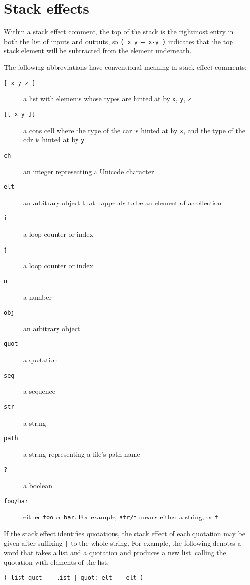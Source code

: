 \documentclass{book}
\begin{document}
\section{Stack effects}

Within a stack effect comment, the top of the stack is the rightmost entry in both the
list of inputs and outputs, so \texttt{( x y -- x-y )} indicates that the top stack element will be subtracted from the element underneath.

The following abbreviations have conventional meaning in stack effect comments:

\begin{description}
\item[\texttt{[ x y z ]}] a list with elements whose types are hinted at by \texttt{x}, \texttt{y}, \texttt{z}
\item[\texttt{[[ x y ]]}] a cons cell where the type of the car is hinted at by \texttt{x}, and the type of the cdr is hinted at by \texttt{y}
\item[\texttt{ch}] an integer representing a Unicode character
\item[\texttt{elt}] an arbitrary object that happends to be an element of a collection
\item[\texttt{i}] a loop counter or index
\item[\texttt{j}] a loop counter or index
\item[\texttt{n}] a number
\item[\texttt{obj}] an arbitrary object
\item[\texttt{quot}] a quotation
\item[\texttt{seq}] a sequence
\item[\texttt{str}] a string
\item[\texttt{path}] a string representing a file's path name
\item[\texttt{?}] a boolean
\item[\texttt{foo/bar}] either \texttt{foo} or \texttt{bar}. For example, \texttt{str/f} means either a string, or \texttt{f}
\end{description}

If the stack effect identifies quotations, the stack effect of each quotation may be given after suffixing \texttt{|} to the whole string. For example, the following denotes a word that takes a list and a quotation and produces a new list, calling the quotation with elements of the list.
\begin{verbatim}
( list quot -- list | quot: elt -- elt )
\end{verbatim}
\end{document}
